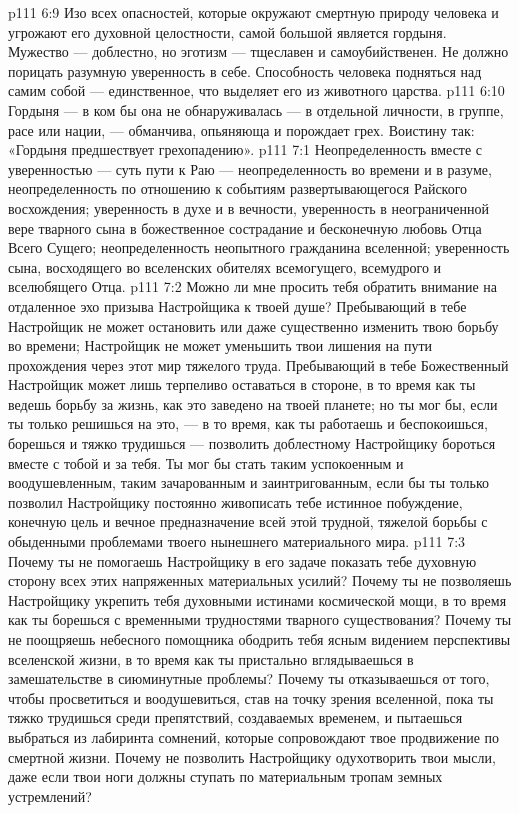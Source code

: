 \vs p111 6:9 \pc Изо всех опасностей, которые окружают смертную природу человека и угрожают его духовной целостности, самой большой является гордыня. Мужество --- доблестно, но эготизм --- тщеславен и самоубийственен. Не должно порицать разумную уверенность в себе. Способность человека подняться над самим собой --- единственное, что выделяет его из животного царства.
\vs p111 6:10 \pc Гордыня --- в ком бы она не обнаруживалась --- в отдельной личности, в группе, расе или нации, --- обманчива, опьяняюща и порождает грех. Воистину так: «Гордыня предшествует грехопадению».
\vs p111 7:1 Неопределенность вместе с уверенностью --- суть пути к Раю --- неопределенность во времени и в разуме, неопределенность по отношению к событиям развертывающегося Райского восхождения; уверенность в духе и в вечности, уверенность в неограниченной вере тварного сына в божественное сострадание и бесконечную любовь Отца Всего Сущего; неопределенность неопытного гражданина вселенной; уверенность сына, восходящего во вселенских обителях всемогущего, всемудрого и вселюбящего Отца.
\vs p111 7:2 \pc Можно ли мне просить тебя обратить внимание на отдаленное эхо призыва Настройщика к твоей душе? Пребывающий в тебе Настройщик не может остановить или даже существенно изменить твою борьбу во времени; Настройщик не может уменьшить твои лишения на пути прохождения через этот мир тяжелого труда. Пребывающий в тебе Божественный Настройщик может лишь терпеливо оставаться в стороне, в то время как ты ведешь борьбу за жизнь, как это заведено на твоей планете; но ты мог бы, если ты только решишься на это, --- в то время, как ты работаешь и беспокоишься, борешься и тяжко трудишься --- позволить доблестному Настройщику бороться вместе с тобой и за тебя. Ты мог бы стать таким успокоенным и воодушевленным, таким зачарованным и заинтригованным, если бы ты только позволил Настройщику постоянно живописать тебе истинное побуждение, конечную цель и вечное предназначение всей этой трудной, тяжелой борьбы с обыденными проблемами твоего нынешнего материального мира.
\vs p111 7:3 Почему ты не помогаешь Настройщику в его задаче показать тебе духовную сторону всех этих напряженных материальных усилий? Почему ты не позволяешь Настройщику укрепить тебя духовными истинами космической мощи, в то время как ты борешься с временными трудностями тварного существования? Почему ты не поощряешь небесного помощника ободрить тебя ясным видением перспективы вселенской жизни, в то время как ты пристально вглядываешься в замешательстве в сиюминутные проблемы? Почему ты отказываешься от того, чтобы просветиться и воодушевиться, став на точку зрения вселенной, пока ты тяжко трудишься среди препятствий, создаваемых временем, и пытаешься выбраться из лабиринта сомнений, которые сопровождают твое продвижение по смертной жизни. Почему не позволить Настройщику одухотворить твои мысли, даже если твои ноги должны ступать по материальным тропам земных устремлений?
